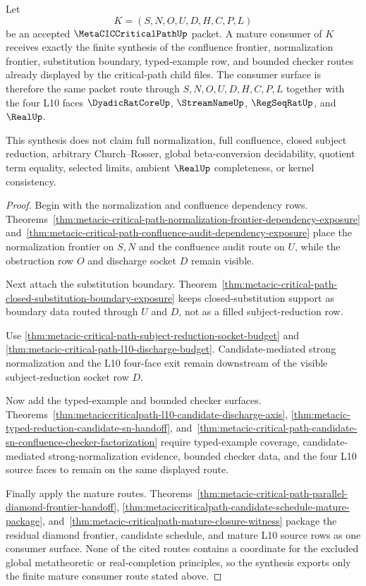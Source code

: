 \begin{theorem}
\label{thm:metaciccriticalpath-mature-consumer-synthesis}
Let
$$
K=(S,N,O,U,D,H,C,P,L)
$$
be an accepted $\MetaCICCriticalPathUp$ packet. A mature consumer of $K$ receives exactly the finite synthesis of the confluence frontier, normalization frontier, substitution boundary, typed-example row, and bounded checker routes already displayed by the critical-path child files. The consumer surface is therefore the same packet route through $S,N,O,U,D,H,C,P,L$ together with the four L10 faces $\DyadicRatCoreUp$, $\StreamNameUp$, $\RegSeqRatUp$, and $\RealUp$.

This synthesis does not claim full normalization, full confluence, closed subject reduction, arbitrary Church--Rosser, global beta-conversion decidability, quotient term equality, selected limits, ambient $\RealUp$ completeness, or kernel consistency.
\end{theorem}
\begin{proof}
Begin with the normalization and confluence dependency rows. Theorems~\ref{thm:metacic-critical-path-normalization-frontier-dependency-exposure} and~\ref{thm:metacic-critical-path-confluence-audit-dependency-exposure} place the normalization frontier on $S,N$ and the confluence audit route on $U$, while the obstruction row $O$ and discharge socket $D$ remain visible.

Next attach the substitution boundary. Theorem~\ref{thm:metacic-critical-path-closed-substitution-boundary-exposure} keeps closed-substitution support as boundary data routed through $U$ and $D$, not as a filled subject-reduction row.

Use \autoref{thm:metacic-critical-path-subject-reduction-socket-budget} and \autoref{thm:metacic-critical-path-l10-discharge-budget}. Candidate-mediated strong normalization and the L10 four-face exit remain downstream of the visible subject-reduction socket row $D$.

Now add the typed-example and bounded checker surfaces. Theorems~\ref{thm:metaciccriticalpath-l10-candidate-discharge-axis}, \ref{thm:metacic-typed-reduction-candidate-sn-handoff}, and~\ref{thm:metacic-critical-path-candidate-sn-confluence-checker-factorization} require typed-example coverage, candidate-mediated strong-normalization evidence, bounded checker data, and the four L10 source faces to remain on the same displayed route.

Finally apply the mature routes. Theorems~\ref{thm:metacic-critical-path-parallel-diamond-frontier-handoff}, \ref{thm:metaciccriticalpath-candidate-schedule-mature-package}, and~\ref{thm:metacic-criticalpath-mature-closure-witness} package the residual diamond frontier, candidate schedule, and mature L10 source rows as one consumer surface. None of the cited routes contains a coordinate for the excluded global metatheoretic or real-completion principles, so the synthesis exports only the finite mature consumer route stated above.
\end{proof}
